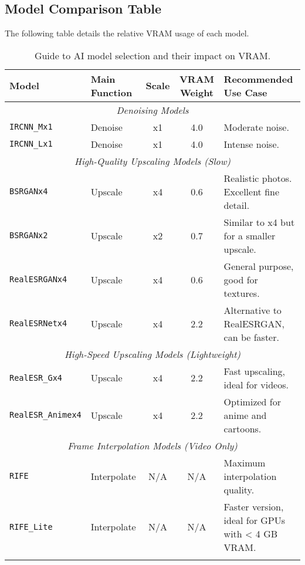 \documentclass[11pt, a4paper]{article}
\begin{document}
\subsection{Model Comparison Table}
The following table details the relative VRAM usage of each model.
\begin{longtable}{l l c c p{6.5cm}}
\toprule
\textbf{Model} & \textbf{Main Function} & \textbf{Scale} & \textbf{VRAM Weight} & \textbf{Recommended Use Case} \\
\midrule
\endhead %

\multicolumn{5}{c}{\textit{Denoising Models}} \\
\midrule
\texttt{IRCNN\_Mx1} & Denoise & x1 & 4.0 & Moderate noise. \\
\texttt{IRCNN\_Lx1} & Denoise & x1 & 4.0 & Intense noise. \\
\midrule
\multicolumn{5}{c}{\textit{High-Quality Upscaling Models (Slow)}} \\
\midrule
\texttt{BSRGANx4} & Upscale & x4 & 0.6 & Realistic photos. Excellent fine detail. \\
\texttt{BSRGANx2} & Upscale & x2 & 0.7 & Similar to x4 but for a smaller upscale. \\
\texttt{RealESRGANx4} & Upscale & x4 & 0.6 & General purpose, good for textures. \\
\texttt{RealESRNetx4} & Upscale & x4 & 2.2 & Alternative to RealESRGAN, can be faster. \\
\midrule
\multicolumn{5}{c}{\textit{High-Speed Upscaling Models (Lightweight)}} \\
\midrule
\texttt{RealESR\_Gx4} & Upscale & x4 & 2.2 & Fast upscaling, ideal for videos. \\
\texttt{RealESR\_Animex4} & Upscale & x4 & 2.2 & Optimized for anime and cartoons. \\
\midrule
\multicolumn{5}{c}{\textit{Frame Interpolation Models (Video Only)}} \\
\midrule
\texttt{RIFE} & Interpolate & N/A & N/A & Maximum interpolation quality. \\
\texttt{RIFE\_Lite} & Interpolate & N/A & N/A & Faster version, ideal for GPUs with < 4 GB VRAM. \\
\bottomrule
\caption{Guide to AI model selection and their impact on VRAM.}
\label{tab:modelos} %
\end{longtable}
\end{document}
